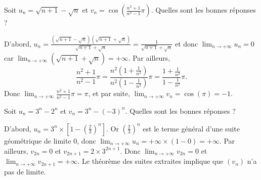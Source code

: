 \begin{question}
Soit $\displaystyle u_n=\sqrt{n+1}-\sqrt{n}$ et $\displaystyle v_n=\cos\left(\frac{n^2+1}{n^2-1}\pi\right)$. Quelles sont les bonnes réponses ?
\begin{answers}  
\end{answers}
\begin{explanations}
D'abord, $\displaystyle u_n=\frac{\left(\sqrt{n+1}-\sqrt{n}\right)\left(\sqrt{n+1}+\sqrt{n}\right)}{\sqrt{n+1}+\sqrt{n}}=\frac{1}{\sqrt{n+1}+\sqrt{n}}$ et donc $\displaystyle \lim _{n\to +\infty}u_n=0$ car $\displaystyle \lim _{n\to +\infty}\left(\sqrt{n+1}+\sqrt{n}\right)=+\infty$. Par ailleurs,
$$\displaystyle \frac{n^2+1}{n^2-1}\pi=\frac{n^2\left(1+\frac{1}{n^2}\right)}{n^2\left(1-\frac{1}{n^2}\right)}\pi=\frac{1+\frac{1}{n^2}}{1-\frac{1}{n^2}}\pi.$$
Donc $\displaystyle \lim _{n\to +\infty}\frac{n^2+1}{n^2-1}\pi=\pi$, et par suite, $\displaystyle \lim _{n\to +\infty}v_n=\cos (\pi)=-1$.
\end{explanations}
\end{question}




\begin{question}
Soit $\displaystyle u_n=3^n-2^n$ et $\displaystyle v_n=3^n-(-3)^n$. Quelles sont les bonnes réponses ?
\begin{answers}  
\end{answers}
\begin{explanations}
D'abord, $\displaystyle u_n=3^n\times \left[1-\left(\frac{2}{3}\right)^n\right]$. Or $\displaystyle \left(\frac{2}{3}\right)^n$ est le terme général d'une suite géométrique de limite $0$, donc $\displaystyle \lim _{n\to +\infty}u_n=+\infty\times (1-0)=+\infty$. Par ailleurs, $\displaystyle v_{2n}=0$ et $v_{2n+1}=2\times 3^{2n+1}$. Donc $\displaystyle \lim _{n\to +\infty}v_{2n}=0$ et $\displaystyle \lim _{n\to +\infty}v_{2n+1}=+\infty$. Le théorème des suites extraites implique que $(v_n)$ n'a pas de limite.
\end{explanations}
\end{question}



